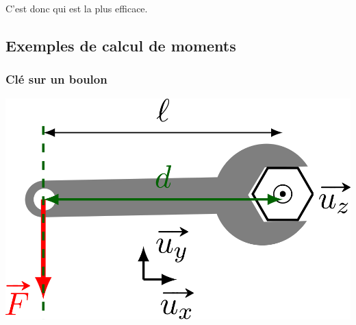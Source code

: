 \documentclass[../../main/main.tex]{subfiles}
\begin{document}
\begin{tcb*}[sidebyside]
\begin{center}
{		}
		\vspace{-15pt}
		C'est donc  qui est la plus efficace.
	\end{center}
\end{tcb*}

\subsection{Exemples de calcul de moments}

\subsubsection{Clé sur un boulon}
\begin{isd}[lefthand ratio=.45]
	\begin{center}
		\includegraphics[scale=1]{moment_cle}
	\end{center}
	\tcblower
	\vspace{-15pt}
\end{isd}
\end{document}
